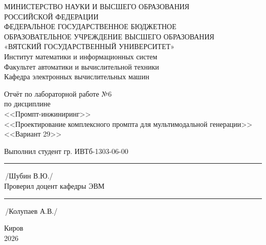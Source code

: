 \documentclass[oneside,a4paper,14pt]{extarticle}
\begin{document}
	\newpage\thispagestyle{empty}
	\begin{center}
		МИНИСТЕРСТВО НАУКИ И ВЫСШЕГО ОБРАЗОВАНИЯ\\
		РОССИЙСКОЙ ФЕДЕРАЦИИ\\
		ФЕДЕРАЛЬНОЕ ГОСУДАРСТВЕННОЕ БЮДЖЕТНОЕ\\
		ОБРАЗОВАТЕЛЬНОЕ УЧРЕЖДЕНИЕ ВЫСШЕГО ОБРАЗОВАНИЯ\\
		«ВЯТСКИЙ ГОСУДАРСТВЕННЫЙ УНИВЕРСИТЕТ»\\
		Институт математики и информационных систем\\
		Факультет автоматики и вычислительной техники\\
		Кафедра электронных вычислительных машин
	\end{center}
	\vspace{20mm}
	\begin{center}
		Отчёт по лабораторной работе №6\\
		по дисциплине\\
		<<Промпт-инжиниринг>>\\
		<<Проектирование комплексного промпта для мультимодальной генерации>>\\
		<<Вариант 29>>\\
	\end{center}
	\vspace{48mm}
	\noindent
	Выполнил студент гр. ИВТб-1303-06-00 \hfill \rule[-0.5mm]{30mm}{0.15mm}\,/Шубин В.Ю./\\[0.5cm]
	Проверил доцент кафедры ЭВМ \hfill \rule[-0.5mm]{30mm}{0.15mm}\,/Колупаев А.В./
	\vfill
	\begin{center}
		Киров\\
		2026
	\end{center}
	\newpage
	\thispagestyle{empty}
\end{document}
